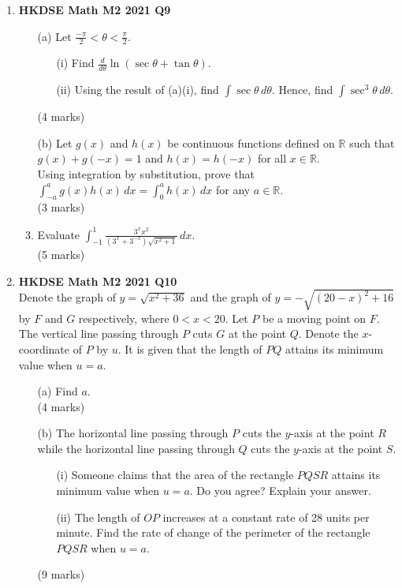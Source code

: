 \documentclass{report}
\begin{document}
\begin{enumerate}
	\item \textbf{HKDSE Math M2 2021 Q9}
	\begin{enumerate}
		\item [(a)] Let $\displaystyle \frac{-\pi}{2} < \theta < \frac{\pi}{2}$.
		\begin{enumerate}
			\item [(i)] Find $\displaystyle \frac{d}{d\theta} \ln{(\sec{\theta} + \tan{\theta})}$.
			\item [(ii)] Using the result of (a)(i), find $\displaystyle \int \sec{\theta} \,d\theta$. Hence, find $\displaystyle \int \sec^3{\theta}\,d\theta$. 
		\end{enumerate}
		(4 marks)
		\item [(b)] Let $g(x)$ and $h(x)$ be continuous functions defined on $\mathbb{R}$ such that $g(x)+g(-x) =1$ and $h(x)=h(-x) $ for all $x \in \mathbb{R}$. \\Using integration by substitution, prove that $\displaystyle\int_{-a}^{a}g(x)h(x)\,dx = \int_{0}^{a}h(x)\,dx$ for any $a \in \mathbb{R}$.\\(3 marks)
		\item Evaluate $\displaystyle \int_{-1}^{1} \frac{3^x x^2}{(3^x+3^{-x})\sqrt{x^2+1}}\,dx$.\\(5 marks)
	\end{enumerate}

	\item \textbf{HKDSE Math M2 2021 Q10}\\
	Denote the graph of $y = \sqrt{x^2+36} $ and the graph of $y = - \sqrt{(20-x)^2+16}$ by $F$ and $G$ respectively, where $0 < x<20$. Let $P$ be a moving point on $F$. The vertical line passing through $P$ cuts $G$ at the point $Q$. Denote the $x$-coordinate of $P$ by $u$. It is given that the length of $PQ$ attains its minimum value when $u=a$.
	\begin{enumerate}
		\item [(a)] Find $a$.\\(4 marks)
		\item [(b)] The horizontal line passing through $P$ cuts the $y$-axis at the point $R$ while the horizontal line passing through $Q$ cuts the $y$-axis at the point $S$.
		\begin{enumerate}
			\item [(i)] Someone claims that the area of the rectangle $PQSR$ attains its minimum value when $u = a$. Do you agree? Explain your answer. 
			\item [(ii)] The length of $OP$ increases at a constant rate of 28 units per minute. Find the rate of change of the perimeter of the rectangle $PQSR$ when $u = a$.
		\end{enumerate}
		(9 marks)
	\end{enumerate}


\end{enumerate}
\end{document}
